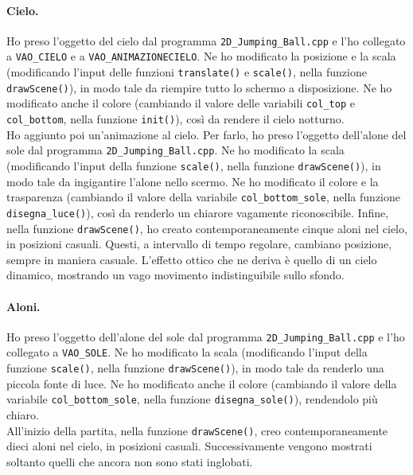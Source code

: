 \documentclass[a4paper, 12pt]{article}
\begin{document}
\paragraph{Cielo.}
Ho preso l'oggetto del cielo dal programma \texttt{2D\_Jumping\_Ball.cpp} e l'ho collegato a \texttt{VAO\_CIELO} e a \texttt{VAO\_ANIMAZIONECIELO}. Ne ho modificato la posizione e la scala (modificando l'input delle funzioni \texttt{translate()} e \texttt{scale()}, nella funzione \texttt{drawScene()}), in modo tale da riempire tutto lo schermo a disposizione. Ne ho modificato anche il colore (cambiando il valore delle variabili \texttt{col\_top} e \texttt{col\_bottom}, nella funzione \texttt{init()}), così da rendere il cielo notturno.\\
Ho aggiunto poi un'animazione al cielo. Per farlo, ho preso l'oggetto dell'alone del sole dal programma \texttt{2D\_Jumping\_Ball.cpp}. Ne ho modificato la scala (modificando l'input della funzione \texttt{scale()}, nella funzione \texttt{drawScene()}), in modo tale da ingigantire l'alone nello scermo. Ne ho modificato il colore e la trasparenza (cambiando il valore della variabile \texttt{col\_bottom\_sole}, nella funzione \texttt{disegna\_luce()}), così da renderlo un chiarore vagamente riconoscibile. Infine, nella funzione \texttt{drawScene()}, ho creato contemporaneamente cinque aloni nel cielo, in posizioni casuali. Questi, a intervallo di tempo regolare, cambiano posizione, sempre in maniera casuale. L'effetto ottico che ne deriva è quello di un cielo dinamico, mostrando un vago movimento indistinguibile sullo sfondo.

\paragraph{Aloni.}
Ho preso l'oggetto dell'alone del sole dal programma \texttt{2D\_Jumping\allowbreak\_Ball.cpp} e l'ho collegato a \texttt{VAO\_SOLE}. Ne ho modificato la scala (modificando l'input della funzione \texttt{scale()}, nella funzione \texttt{drawScene()}), in modo tale da renderlo una piccola fonte di luce. Ne ho modificato anche il colore (cambiando il valore della variabile \texttt{col\_bottom\_sole}, nella funzione \texttt{disegna\_sole()}), rendendolo più chiaro.\\
All'inizio della partita, nella funzione \texttt{drawScene()}, creo contemporaneamente dieci aloni nel cielo, in posizioni casuali. Successivamente vengono mostrati soltanto quelli che ancora non sono stati inglobati.
\end{document}
